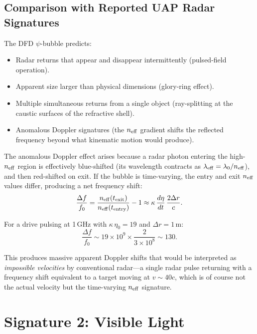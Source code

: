 \documentclass[11pt]{article}
\newcommand{\neff}{n_{\rm eff}}
\begin{document}
\subsection{Comparison with Reported UAP Radar Signatures}

The DFD $\psi$-bubble predicts:
\begin{itemize}[noitemsep]
\item Radar returns that appear and disappear intermittently
  (pulsed-field operation).
\item Apparent size larger than physical dimensions (glory-ring effect).
\item Multiple simultaneous returns from a single object (ray-splitting
  at the caustic surfaces of the refractive shell).
\item Anomalous Doppler signatures (the $\neff$ gradient shifts the
  reflected frequency beyond what kinematic motion would produce).
\end{itemize}

The anomalous Doppler effect arises because a radar photon entering the
high-$\neff$ region is effectively blue-shifted (its wavelength contracts
as $\lambda_{\rm eff} = \lambda_0/\neff$), and then red-shifted on exit.
If the bubble is time-varying, the entry and exit $\neff$ values differ,
producing a net frequency shift:
\begin{equation}\label{eq:doppler-anomaly}
\frac{\Delta f}{f_0} = \frac{\neff(t_{\rm exit})}{\neff(t_{\rm entry})} - 1
  \approx \kappa\,\frac{d\eta}{dt}\,\frac{2\Delta r}{c}.
\end{equation}

For a drive pulsing at 1\,GHz with $\kappa\,\eta_0 = 19$ and
$\Delta r = 1$\,m:
\begin{equation}
\frac{\Delta f}{f_0} \sim 19 \times 10^9 \times \frac{2}{3 \times 10^8}
  \sim 130.
\end{equation}

This produces massive apparent Doppler shifts that would be interpreted as
\emph{impossible velocities} by conventional radar---a single radar pulse
returning with a frequency shift equivalent to a target moving at $v \sim
40c$, which is of course not the actual velocity but the time-varying
$\neff$ signature.


\section{Signature 2: Visible Light}\label{sec:optical}
\end{document}
